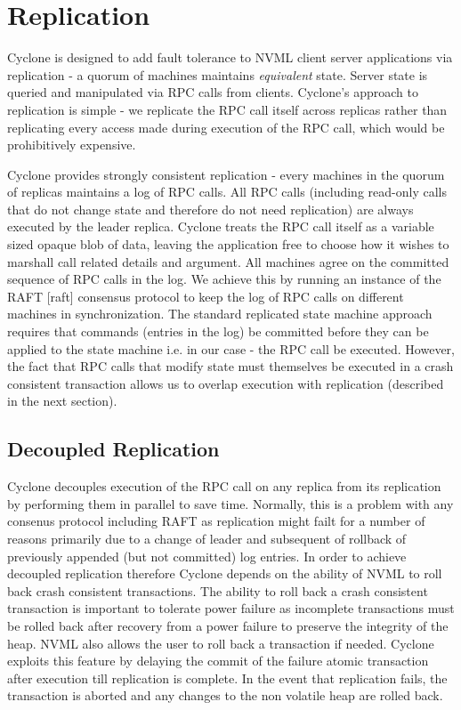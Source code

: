 \documentclass[twocolumn]{article}
\begin{document}
\section{Replication}
Cyclone is designed to add fault tolerance to NVML client server applications
via replication - a quorum of machines maintains \emph{equivalent} state. Server
state is queried and manipulated via RPC calls from clients. Cyclone's approach
to replication is simple - we replicate the RPC call itself across replicas
rather than replicating every access made during execution of the RPC call,
which would be prohibitively expensive.

Cyclone provides strongly consistent replication - every machines in the quorum
of replicas maintains a log of RPC calls. All RPC calls (including read-only
calls that do not change state and therefore do not need replication) are always
executed by the leader replica. Cyclone treats the RPC call itself as a variable
sized opaque blob of data, leaving the application free to choose how it wishes
to marshall call related details and argument. All machines agree on the
committed sequence of RPC calls in the log. We achieve this by running an
instance of the RAFT [raft] consensus protocol to keep the log of RPC calls on
different machines in synchronization. The standard replicated state machine
approach requires that commands (entries in the log) be committed before they
can be applied to the state machine i.e. in our case - the RPC call be
executed. However, the fact that RPC calls that modify state must themselves be
executed in a crash consistent transaction allows us to overlap execution with
replication (described in the next section).

\subsection{Decoupled Replication}
\label{sec:decouple}
Cyclone decouples execution of the RPC call on any replica from its replication
by performing them in parallel to save time. Normally, this is a problem with
any consenus protocol including RAFT as replication might failt for a number of
reasons primarily due to a change of leader and subsequent of rollback of
previously appended (but not committed) log entries. In order to achieve
decoupled replication therefore Cyclone depends on the ability of NVML to roll
back crash consistent transactions. The ability to roll back a crash consistent
transaction is important to tolerate power failure as incomplete transactions
must be rolled back after recovery from a power failure to preserve the
integrity of the heap. NVML also allows the user to roll back a transaction if
needed. Cyclone exploits this feature by delaying the commit of the failure
atomic transaction after execution till replication is complete. In the event
that replication fails, the transaction is aborted and any changes to the non
volatile heap are rolled back.
\end{document}
